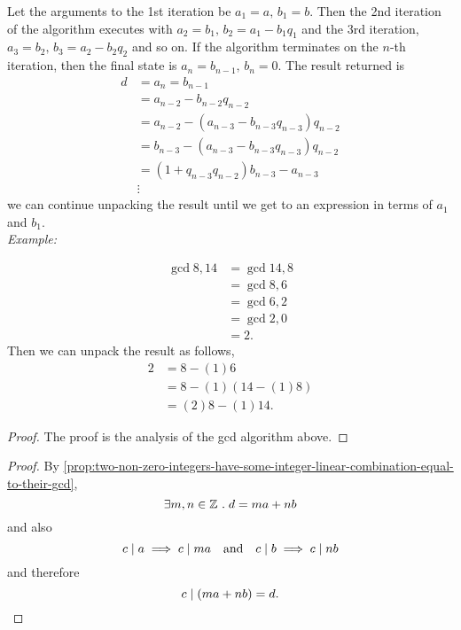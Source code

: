 \documentclass[../MathsNotesBase.tex]{subfiles}
\begin{document}
{		Let the arguments to the 1st iteration be ${ a_1 = a,\, b_1 = b }$. Then the 2nd iteration of the algorithm executes with ${ a_2 = b_1,\, b_2 = a_1 - b_1 q_1 }$ and the 3rd iteration, ${ a_3 = b_2,\, b_3 = a_2 - b_2 q_2 }$ and so on. If the algorithm terminates on the $n$-th iteration, then the final state is ${ a_n = b_{n-1},\, b_n = 0 }$. The result returned is
		\[\begin{aligned}
			d &= a_n = b_{n-1} \\
			&= a_{n-2} - b_{n-2} q_{n-2} \\
			&= a_{n-2} - (a_{n-3} - b_{n-3} q_{n-3}) q_{n-2} \\
			&= b_{n-3} - (a_{n-3} - b_{n-3} q_{n-3}) q_{n-2} \\
			&= (1 + q_{n-3} q_{n-2}) b_{n-3} - a_{n-3} \\
			&\vdots
		\end{aligned}\]
		we can continue unpacking the result until we get to an expression in terms of $a_1$ and $b_1$.\\
		
		\textit{Example:}
		
		\[\begin{aligned}
			\operatorname{gcd} 8,14 &= \operatorname{gcd} 14,8 \\
			&= \operatorname{gcd} 8,6 \\
			&= \operatorname{gcd} 6,2 \\
			&= \operatorname{gcd} 2,0 \\
			&= 2.
		\end{aligned}\]
		Then we can unpack the result as follows,
		\[\begin{aligned}
			2 &= 8 - (1)6 \\
			&= 8 - (1)(14 - (1)8) \\
			&= (2)8 - (1)14.
		\end{aligned}\]



		\bigskip
		\begin{proof}
			The proof is the analysis of the gcd algorithm above. 
		\end{proof}
	
		\bigskip
		\begin{proof}
			By \autoref{prop:two-non-zero-integers-have-some-integer-linear-combination-equal-to-their-gcd},
			\[ \exists m,n \in \mathbb{Z}^{} \;.\; d = ma + nb \]
			and also
			\[ c \mid a \implies c \mid ma \hspace{10pt}\text{and}\hspace{10pt} c \mid b \implies c \mid nb \]
			and therefore
			\[ c \mid (ma + nb) = d. \qedhere \]
		\end{proof}

}
\end{document}
